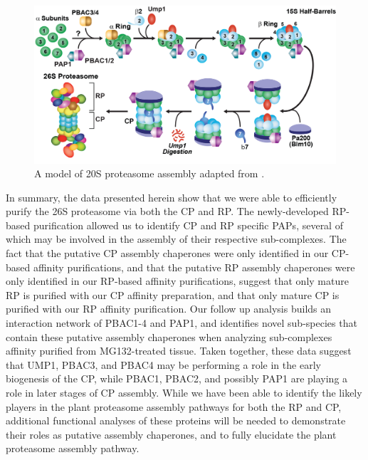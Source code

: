 \begin{figure}
	\centering
	\includegraphics[width=\columnwidth]{Proteasome/cpassemblymodel.png}
	{A model of 20S proteasome assembly adapted from \citep{murata09}.}
	\label{fig:cpassembly}
\end{figure}

\FloatBarrier

In summary, the data presented herein show that we were able to efficiently purify the 26S proteasome via both the CP and RP. The newly-developed RP-based purification allowed us to identify CP and RP specific PAPs, several of which may be involved in the assembly of their respective sub-complexes. The fact that the putative CP assembly chaperones were only identified in our CP-based affinity purifications, and that the putative RP assembly chaperones were only identified in our RP-based affinity purifications, suggest that only mature RP is purified with our CP affinity preparation, and that only mature CP is purified with our RP affinity purification. Our follow up analysis builds an interaction network of PBAC1-4 and PAP1, and identifies novel sub-species that contain these putative assembly chaperones when analyzing sub-complexes affinity purified from MG132-treated tissue. Taken together, these data suggest that UMP1, PBAC3, and PBAC4 may be performing a role in the early biogenesis of the CP, while PBAC1, PBAC2, and possibly PAP1 are playing a role in later stages of CP assembly. While we have been able to identify the likely players in the plant proteasome assembly pathways for both the RP and CP, additional functional analyses of these proteins will be needed to demonstrate their roles as putative assembly chaperones, and to fully elucidate the plant proteasome assembly pathway.  

